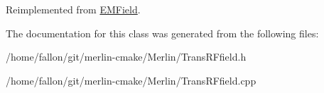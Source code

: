 Reimplemented from \hyperlink{classEMField_aa00f4f213a55c9223f6ca08463a57691}{E\+M\+Field}.



The documentation for this class was generated from the following files\+:\begin{DoxyCompactItemize}
\item 
/home/fallon/git/merlin-\/cmake/\+Merlin/Trans\+R\+Ffield.\+h\item 
/home/fallon/git/merlin-\/cmake/\+Merlin/Trans\+R\+Ffield.\+cpp\end{DoxyCompactItemize}
